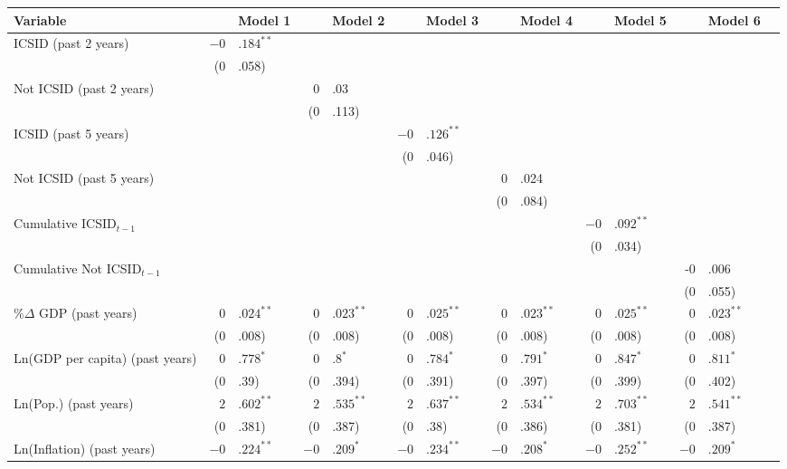 \begin{enumerate}
\begin{itemize}
			\begin{table}[ht]
			\centering
			\begingroup\footnotesize
			\begin{tabular}{lr@{} lr@{}lr@{}lr@{} lr@{}lr@{}lr@{}}
			Variable && Model 1 && Model 2 && Model 3 && Model 4 && Model 5 && Model 6 \\ 
			  \hline
			\hline
			ICSID (past 2 years) & $-0$&$.184^{\ast\ast}$ &&  &&  &&  &&  &&  \\ 
			   & (0&.058) &&  &&  &&  &&  &&  \\ 
			  Not ICSID (past 2 years) &  && 0&.03 &&  &&  &&  &&  \\ 
			   &  && (0&.113) &&  &&  &&  &&  \\ 
			  ICSID (past 5 years) &  &&  && $-0$&$.126^{\ast\ast}$ &&  &&  &&  \\ 
			   &  &&  && (0&.046) &&  &&  &&  \\ 
			  Not ICSID (past 5 years) &  &&  &&  && 0&.024 &&  &&  \\ 
			   &  &&  &&  && (0&.084) &&  &&  \\    
			  Cumulative ICSID$_{t-1}$ &  &&  &&  &&  && $-0$&$.092^{\ast\ast}$ &&  \\ 
			   &  &&  &&  &&  && (0&.034) &&  \\ 
			  Cumulative Not ICSID$_{t-1}$ &  &&  &&  &&  &&  && -0&.006 \\ 
			   &  &&  &&  &&  &&  && (0&.055) \\ 
			  \%$\Delta$ GDP (past  years) & $0$&$.024^{\ast\ast}$ & $0$&$.023^{\ast\ast}$ & $0$&$.025^{\ast\ast}$ & $0$&$.023^{\ast\ast}$ & $0$&$.025^{\ast\ast}$ & $0$&$.023^{\ast\ast}$ \\ 
			   & (0&.008) & (0&.008) & (0&.008) & (0&.008) & (0&.008) & (0&.008) \\ 
			  Ln(GDP per capita) (past  years) & $0$&$.778^{\ast}$ & $0$&$.8^{\ast}$ & $0$&$.784^{\ast}$ & $0$&$.791^{\ast}$ & $0$&$.847^{\ast}$ & $0$&$.811^{\ast}$ \\ 
			   & (0&.39) & (0&.394) & (0&.391) & (0&.397) & (0&.399) & (0&.402) \\ 
			  Ln(Pop.) (past  years) & $2$&$.602^{\ast\ast}$ & $2$&$.535^{\ast\ast}$ & $2$&$.637^{\ast\ast}$ & $2$&$.534^{\ast\ast}$ & $2$&$.703^{\ast\ast}$ & $2$&$.541^{\ast\ast}$ \\ 
			   & (0&.381) & (0&.387) & (0&.38) & (0&.386) & (0&.381) & (0&.387) \\ 
			  Ln(Inflation) (past  years) & $-0$&$.224^{\ast\ast}$ & $-0$&$.209^{\ast}$ & $-0$&$.234^{\ast\ast}$ & $-0$&$.208^{\ast}$ & $-0$&$.252^{\ast\ast}$ & $-0$&$.209^{\ast}$ \\ 

\end{tabular}
\end{table}
\end{itemize}
\end{enumerate}
